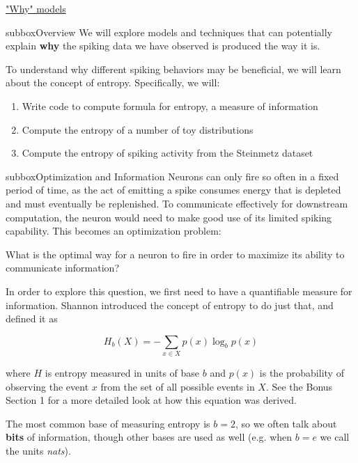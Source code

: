 \begin{textbox}{\href{https://compneuro.neuromatch.io/tutorials/W1D1_ModelTypes/student/W1D1_Tutorial3.html}{"Why" models }  }

\begin{subbox}{subbox}{Overview}
\scriptsize
We will explore models and techniques that can potentially explain \textbf{why} the spiking data we have observed is produced the way it is.

To understand why different spiking behaviors may be beneficial, we will learn about the concept of entropy. Specifically, we will:

\begin{enumerate}
    \item  Write code to compute formula for entropy, a measure of information
 \item  Compute the entropy of a number of toy distributions
 \item  Compute the entropy of spiking activity from the Steinmetz dataset

\end{enumerate}
\end{subbox}
\begin{subbox}{subbox}{Optimization and Information}
\scriptsize
Neurons can only fire so often in a fixed period of time, as the act of emitting a spike consumes energy that is depleted and must eventually be replenished. To communicate effectively for downstream computation, the neuron would need to make good use of its limited spiking capability. This becomes an optimization problem: 

What is the optimal way for a neuron to fire in order to maximize its ability to communicate information?

In order to explore this question, we first need to have a quantifiable measure for information. Shannon introduced the concept of entropy to do just that, and defined it as

\begin{equation}
H_b(X) = -\sum_{x\in X} p(x) \log_b p(x)
\end{equation}

where $H$ is entropy measured in units of base $b$ and $p(x)$ is the probability of observing the event $x$ from the set of all possible events in $X$. See the Bonus Section 1 for a more detailed look at how this equation was derived.

The most common base of measuring entropy is $b=2$, so we often talk about \textbf{bits} of information, though other bases are used as well (e.g. when $b=e$ we call the units \textit{nats}).


\end{subbox}
\end{textbox}
